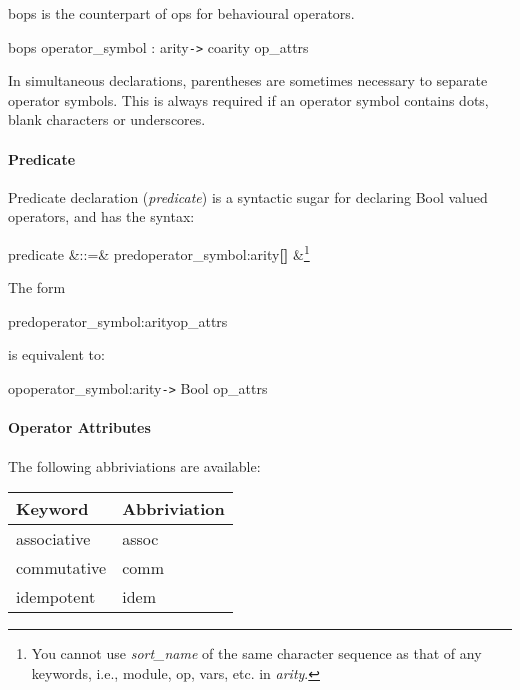\documentclass[a4paper]{article}
\def\sym#1{\textsf{#1}\null}
\def\nonterm#1{\textit{#1}\null}
\def\optn#1{\textbf{[}\;{#1}\;\textbf{]}}
\begin{document}
\sym{bops} is the counterpart of \sym{ops} for behavioural operators.
\begin{syntax}
  \sym{bops}\; operator\_symbol\;\cdots\; : \; arity\;\verb|->|\;
  coarity \; op\_attrs
\end{syntax}

In simultaneous declarations, parentheses are sometimes necessary
to separate operator symbols. This is always required if an operator
symbol contains dots, blank characters or underscores.
  
\paragraph{Predicate}
Predicate declaration (\nonterm{predicate}) is a syntactic sugar for
declaring \sym{Bool} valued operators, and has the syntax:
\begin{syntax}
  predicate &::=&
  \sym{pred}\;operator\_symbol\;:\;arity\;\optn{op\_attrs}
  &\footnote{You cannot use \nonterm{sort\_name} of the same
    character sequence as that of any keywords, i.e., \sym{module}, 
    \sym{op}, \sym{vars}, etc. in \nonterm{arity}.}
\end{syntax}
The form
\begin{syntax}
 \sym{pred}\;operator\_symbol\;:\;arity\;op\_attrs 
\end{syntax}
is equivalent to:
\begin{syntax}
\sym{op}\;operator\_symbol\;:\;arity\;\verb|->|\; \sym{Bool} \;op\_attrs
\end{syntax}

\paragraph{Operator Attributes}
The following abbriviations are available:
\begin{center}
  \begin{tabular}{ll}\hline
    Keyword & Abbriviation \\\hline
    \sym{associative} & \sym{assoc} \\
    \sym{commutative} & \sym{comm} \\
    \sym{idempotent} & \sym{idem} \\\hline
  \end{tabular}
\end{center}
\end{document}
